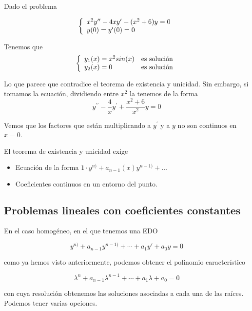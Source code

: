 \begin{example}
Dado el problema


\begin{equation}
\left\lbrace \begin{array}{l l}
	$$x^2y^{\prime\prime}-4xy^\prime+(x^2+6)y = 0$$\\
	y(0) = y^\prime(0) = 0
\end{array} \right.
\end{equation}

Tenemos que
\begin{equation}
\left\lbrace \begin{array}{l l}
	y_1(x) = x^2sin(x) & \text{es solución}\\
	y_2(x) = 0 & \text{es solución}
\end{array} \right.
\end{equation}

Lo que parece que contradice el teorema de existencia y unicidad. Sin embargo, si tomamos la ecuación, dividiendo entre $x^2$ la tenemos de la forma
$$y^{\prime\prime}-\frac{4}{x}y^\prime + \frac{x^2+6}{x^2}y = 0$$

Vemos que los factores que están multiplicando a $y^\prime$ y a $y$ no son continuos en $x=0$.
\end{example}

\obs
El teorema de existencia y unicidad exige
\begin{itemize}
\item Ecuación de la forma $1\cdot y^{n)}+a_{n-1}(x)y^{n-1)}+\hdots$
\item Coeficientes continuos en un entorno del punto.
\end{itemize}

\subsection{Problemas lineales con coeficientes constantes}
\label{secEcHomoLinealConstante}
En el caso homogéneo, en el que tenemos una EDO

\[ y^{n)} + a_{n-1}y^{n-1)} + \dotsb + a_1y' + a_0 y = 0 \]

como ya hemos visto anteriormente, podemos obtener el polinomio característico

\[ λ^n + a_{n-1}λ^{n-1} + \dotsb + a_1λ + a_0 = 0 \]

con cuya resolución obtenemos las soluciones asociadas a cada una de las raíces. Podemos tener varias opciones.

